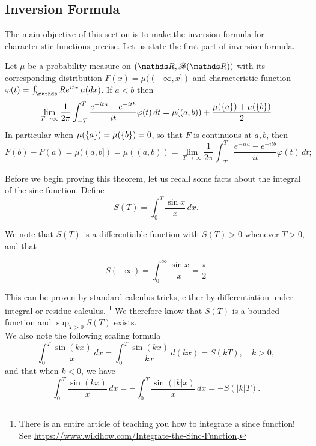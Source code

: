 \subsection{Inversion Formula}
The main objective of this section is to make the inversion formula for characteristic functions precise. Let us state the first part of inversion formula.

\begin{theorem} \label{thm:inversion_I}
Let $\mu$ be a probability measure on $(\R,\B(\R))$ with its corresponding distribution $F(x) = \mu((-\infty,x])$ and characteristic function $\varphi(t) = \int_\R e^{itx} \, \mu(dx)$. If $a<b$ then
\begin{equation}
\lim_{T\to\infty} \frac{1}{2\pi} \int_{-T}^T \frac{e^{-ita}-e^{-itb}}{it} \varphi(t) \, dt = \mu((a,b)) + \frac{\mu(\left\{ a \right \}) + \mu(\left\{ b \right \})}{2}
\end{equation}
In particular when $\mu(\left\{ a \right \}) = \mu(\left\{ b \right \}) = 0$, so that $F$ is continuous at $a,b$, then 
\begin{equation}
    F(b) - F(a) = \mu((a,b]) = \mu((a,b)) = \lim_{T \to \infty} \frac{1}{2\pi} \int_{-T}^T \frac{e^{-ita} - e^{-itb}}{it} \varphi(t) \, dt;
\end{equation}
\end{theorem}

Before we begin proving this theorem, let us recall some facts about the integral of the sinc function. Define
\begin{equation}
S(T) = \int_0^T \frac{\sin x}{x} \, dx.
\end{equation}

We note that $S(T)$ is a differentiable function with $S(T) > 0$ whenever $T > 0$, and that

\begin{lemma}
\begin{equation}
S(+\infty) = \int_0^\infty \frac{\sin x}{x} = \frac{\pi}{2}
\end{equation}
\end{lemma}

This can be proven by standard calculus tricks, either by differentiation under integral or residue calculus. \footnote{There is an entire article of teaching you how to integrate a since function! See \url{https://www.wikihow.com/Integrate-the-Sinc-Function}.} We therefore know that $S(T)$ is a bounded function and $\sup_{T>0} S(T)$ exists. \\

We also note the following scaling formula 
\begin{equation}
\int_0^T \frac{\sin(kx)}{x} \, dx= \int_0^T \frac{\sin(kx)}{kx} \, d(kx) = S(kT), \quad k > 0,
\end{equation}
and that when $k < 0$, we have
\begin{equation}
\int_0^T \frac{\sin(kx)}{x} \, dx= -\int_0^T \frac{\sin(|k|x)}{x} \, dx = -S(|k|T).
\end{equation}

